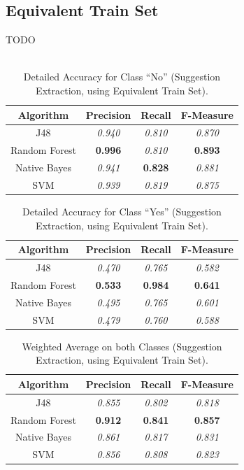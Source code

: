\subsection{Equivalent Train Set}\label{422_ref}
TODO\\
\\

\begin{table}[H]
\centering
\caption{Detailed Accuracy for Class “No” (Suggestion Extraction, using Equivalent Train Set).}
\label{49_table_rer}
\begin{tabular}{cccc}
\hline
{\bf Algorithm} & {\bf Precision} & {\bf Recall} & {\bf F-Measure} \\ \hline
J48             & {\it 0.940}      & {\it 0.810}   & {\it 0.870}      \\
Random Forest   & {\bf 0.996}     & {\it 0.810}   & {\bf 0.893}     \\
Native Bayes    & {\it 0.941}     & {\bf 0.828}  & {\it 0.881}     \\
SVM             & {\it 0.939}     & {\it 0.819}  & {\it 0.875}     \\ \hline
\end{tabular}
\end{table}

\begin{table}[H]
\centering
\caption{Detailed Accuracy for Class “Yes” (Suggestion Extraction, using Equivalent Train Set).}
\label{410_table_rer}
\begin{tabular}{cccc}
\hline
{\bf Algorithm} & {\bf Precision} & {\bf Recall} & {\bf F-Measure} \\ \hline
J48             & {\it 0.470}      & {\it 0.765}  & {\it 0.582}     \\
Random Forest   & {\bf 0.533}     & {\bf 0.984}  & {\bf 0.641}     \\
Native Bayes    & {\it 0.495}     & {\it 0.765}  & {\it 0.601}     \\
SVM             & {\it 0.479}     & {\it 0.760}   & {\it 0.588}     \\ \hline
\end{tabular}
\end{table}

\begin{table}[H]
\centering
\caption{Weighted Average on both Classes (Suggestion Extraction, using Equivalent Train Set).}
\label{411_table_rer}
\begin{tabular}{cccc}
\hline
{\bf Algorithm} & {\bf Precision} & {\bf Recall} & {\bf F-Measure} \\ \hline
J48             & {\it 0.855}     & {\it 0.802}  & {\it 0.818}     \\
Random Forest   & {\bf 0.912}     & {\bf 0.841}  & {\bf 0.857}     \\
Native Bayes    & {\it 0.861}     & {\it 0.817}  & {\it 0.831}     \\
SVM             & {\it 0.856}     & {\it 0.808}  & {\it 0.823}     \\ \hline
\end{tabular}
\end{table}

